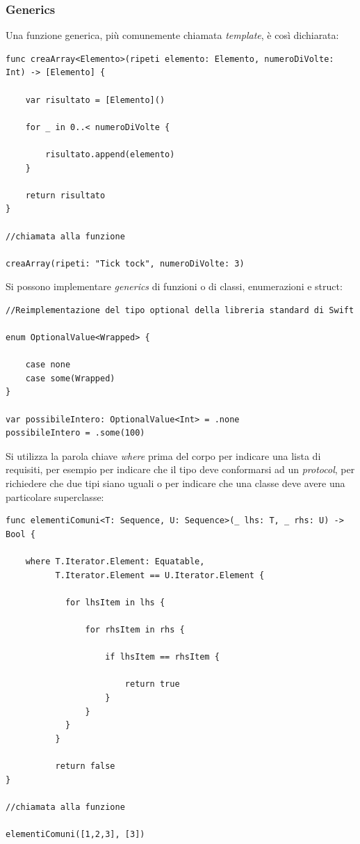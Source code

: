 \subsubsection{Generics}
Una funzione generica, più comunemente chiamata \textit{template}, è così dichiarata:
\lstset{language=[Objective]C, breakindent=40pt, breaklines} 
\begin{lstlisting}
func creaArray<Elemento>(ripeti	elemento: Elemento, numeroDiVolte: Int) -> [Elemento] {

	var risultato = [Elemento]()
	
	for _ in 0..< numeroDiVolte {
		
		risultato.append(elemento)
	}
	
	return risultato
}

//chiamata alla funzione 

creaArray(ripeti: "Tick tock", numeroDiVolte: 3)
\end{lstlisting}
Si possono implementare \textit{generics} di funzioni o di classi, enumerazioni e struct:
\lstset{language=[Objective]C, breakindent=40pt, breaklines}
\begin{lstlisting}
//Reimplementazione del tipo optional della libreria standard di Swift

enum OptionalValue<Wrapped> {

	case none 
	case some(Wrapped)
}

var possibileIntero: OptionalValue<Int> = .none
possibileIntero = .some(100)
\end{lstlisting}
Si utilizza la parola chiave \textit{where} prima del corpo per indicare una lista di requisiti, per esempio per indicare che il tipo deve conformarsi ad un \textit{protocol}, per richiedere che due tipi siano uguali o per indicare che una classe deve avere una particolare superclasse: 
\lstset{language=[Objective]C, breakindent=40pt, breaklines}
\begin{lstlisting}
func elementiComuni<T: Sequence, U: Sequence>(_ lhs: T, _ rhs: U) -> Bool {
	
	where T.Iterator.Element: Equatable,
		  T.Iterator.Element == U.Iterator.Element {
		  
		  	for lhsItem in lhs {
		  	
		  		for rhsItem in rhs {
		  		
		  			if lhsItem == rhsItem {
		  				
		  				return true
		  			}
		  		}
		  	}
		  }
		  
		  return false
}

//chiamata alla funzione 

elementiComuni([1,2,3], [3])
\end{lstlisting}
